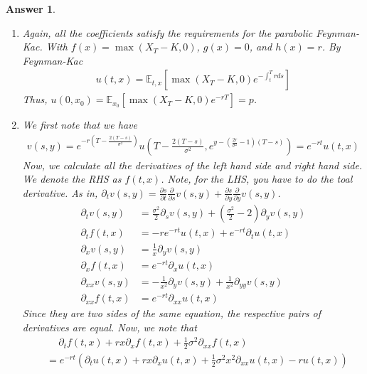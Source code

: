 \documentclass[12pt]{article}
\theoremstyle{colon}
\newtheorem*{answer}{Answer}
\begin{document}
\begin{answer}
  \leavevmode
  \begin{enumerate}[label=\alph*)]
    \item Again, all the coefficients satisfy the requirements for the parabolic Feynman-Kac. With $f(x) = \max(X_T - K, 0)$, $g(x) = 0$, and $h(x) = r$. By Feynman-Kac
      \begin{gather*}
        u(t,x) = \mathbb{E}_{t,x}[\max(X_T - K, 0) e^{-\int_t^T r ds}]
      \end{gather*}
      Thus, $u(0, x_0) = \mathbb{E}_{x_0}[\max(X_T - K, 0) e^{-r T}] = p$.

    \item We first note that we have
      \begin{gather*}
        v(s, y) = e^{-r \left( T - \frac{2(T-s)}{\sigma^2} \right)} u \left(T - \frac{2(T-s)}{\sigma^2}, e^{y - \left( \frac{2r}{\sigma^2} - 1 \right)(T-s)} \right) = e^{-r t} u(t,x)
      \end{gather*}
      Now, we calculate all the derivatives of the left hand side and right hand side. We denote the RHS as $f(t,x)$. Note, for the LHS, you have to do the toal derivative. As in, $\partial_t v(s,y) = \frac{\partial s}{\partial t} \frac{\partial}{\partial s} v(s,y) + \frac{\partial s}{\partial y} \frac{\partial}{\partial y} v(s,y)$.
      \begin{align*}
        \partial_t v(s,y) &= \frac{\sigma^2}{2} \partial_s v(s,y) + \left(\frac{\sigma^2}{2} - 2 \right) \partial_y v(s,y) \\
        \partial_t f(t,x) &= -re^{-rt} u(t,x) + e^{-rt} \partial_t u(t,x) \\
        \partial_x v(s,y) &= \frac{1}{x} \partial_y v(s,y) \\
        \partial_x f(t,x) &= e^{-rt} \partial_x u(t,x) \\
        \partial_{xx} v(s,y) &= -\frac{1}{x^2} \partial_y v(s,y) + \frac{1}{x^2} \partial_{yy} v(s,y) \\
        \partial_{xx} f(t,x) &= e^{-rt} \partial_{xx} u(t,x)
      \end{align*}
      Since they are two sides of the same equation, the respective pairs of derivatives are equal. Now, we note that
      \begin{align*}
        &\quad \ \partial_t f(t,x) + r x \partial_x f(t,x) + \frac{1}{2} \sigma^2 \partial_{xx} f(t,x)\\
        &= e^{-rt} \left( \partial_t u(t,x) + rx \partial_x u(t,x) + \frac{1}{2} \sigma^2 x^2 \partial_{xx} u(t,x) - r u(t,x) \right) \\

\end{align*}
\end{enumerate}
\end{answer}
\end{document}
